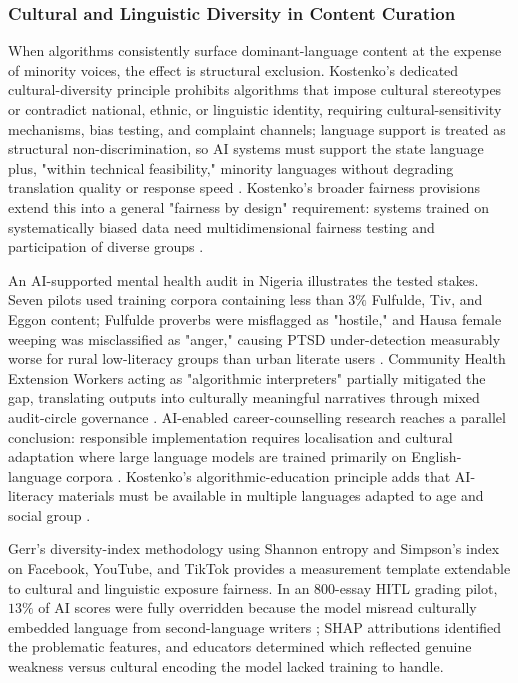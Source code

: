 \documentclass[11pt]{article}
\begin{document}
\subsubsection{Cultural and Linguistic Diversity in Content Curation}
\label{sec:cultural_linguistic_diversity_curation} When algorithms consistently surface dominant-language content at the expense of minority voices, the effect is structural exclusion. Kostenko's dedicated cultural-diversity principle prohibits algorithms that impose cultural stereotypes or contradict national, ethnic, or linguistic identity, requiring cultural-sensitivity mechanisms, bias testing, and complaint channels; language support is treated as structural non-discrimination, so AI systems must support the state language plus, "within technical feasibility," minority languages without degrading translation quality or response speed \parencites[182]{2977039}. Kostenko's broader fairness provisions extend this into a general "fairness by design" requirement: systems trained on systematically biased data need multidimensional fairness testing and participation of diverse groups \parencites[73]{2977039}[75]{2977039}.

An AI-supported mental health audit in Nigeria illustrates the tested stakes. Seven pilots used training corpora containing less than $3\%$ Fulfulde, Tiv, and Eggon content; Fulfulde proverbs were misflagged as "hostile," and Hausa female weeping was misclassified as "anger," causing PTSD under-detection measurably worse for rural low-literacy groups than urban literate users \parencites[10]{5419804}. Community Health Extension Workers acting as "algorithmic interpreters" partially mitigated the gap, translating outputs into culturally meaningful narratives through mixed audit-circle governance \parencites[11]{5419804}[2]{5419804}. AI-enabled career-counselling research reaches a parallel conclusion: responsible implementation requires localisation and cultural adaptation where large language models are trained primarily on English-language corpora \parencites{9762591}. Kostenko's algorithmic-education principle adds that AI-literacy materials must be available in multiple languages adapted to age and social group \parencites[98]{2977039}.

Gerr's diversity-index methodology using Shannon entropy and Simpson's index on Facebook, YouTube, and TikTok \parencites[3]{5142478}[5]{5142478} provides a measurement template extendable to cultural and linguistic exposure fairness. In an 800-essay HITL grading pilot, $13\%$ of AI scores were fully overridden because the model misread culturally embedded language from second-language writers \parencites[8]{5142478}[19]{6805789}; SHAP attributions identified the problematic features, and educators determined which reflected genuine weakness versus cultural encoding the model lacked training to handle.
\end{document}
